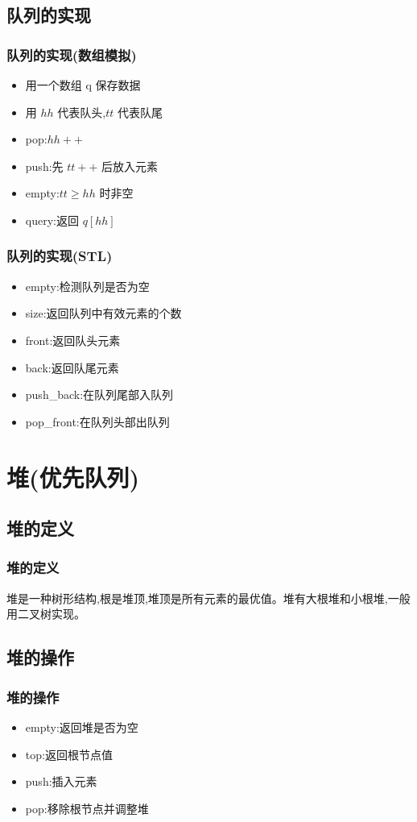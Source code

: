 \documentclass{beamer}
\begin{document}
\subsection{队列的实现}
\begin{frame}
\frametitle{队列的实现(数组模拟)}
\begin{itemize}
    \item 用一个数组 q 保存数据
    \item 用 $hh$ 代表队头,$tt$ 代表队尾
    \item pop:$hh++$
    \item push:先 $tt++$ 后放入元素
    \item empty:$tt \ge hh$ 时非空
    \item query:返回 $q[hh]$
\end{itemize}
\end{frame}

\begin{frame}
\frametitle{队列的实现(STL)}
\begin{itemize}
    \item empty:检测队列是否为空
    \item size:返回队列中有效元素的个数
    \item front:返回队头元素
    \item back:返回队尾元素
    \item push\_back:在队列尾部入队列
    \item pop\_front:在队列头部出队列
\end{itemize}
\end{frame}

\section{堆(优先队列)}
\frame{\sectionpage}
\subsection{堆的定义}
\begin{frame}
\frametitle{堆的定义}
堆是一种树形结构,根是堆顶,堆顶是所有元素的最优值。堆有大根堆和小根堆,一般用二叉树实现。
\end{frame}

\subsection{堆的操作}
\begin{frame}
\frametitle{堆的操作}
\begin{itemize}
    \item empty:返回堆是否为空
    \item top:返回根节点值
    \item push:插入元素
    \item pop:移除根节点并调整堆
\end{itemize}
\end{frame}
\end{document}
